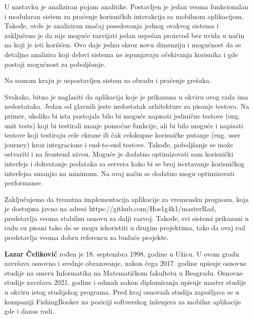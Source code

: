 \documentclass[12pt,oneside]{memoir}
\begin{document}
U nastavku je analiziran pojam analitike. Postavljen je jedan veoma funkcionalan i modularan sistem za praćenje korisničkih interakcija sa mobilnom aplikacijom. Takođe, ovde je analiziran značaj posedovanja jednog ovakvog sistema i zaključeno je da nije moguće razvijati jedan uspešan proizvod bez uvida u način na koji je isti korišćen. Ovo daje jednu skroz novu dimenziju i mogućnost da se detaljno analizira koji delovi sistema ne ispunjavaju očekivanja korisnika i gde postoji mogućnost za poboljšanje.

Na samom kraju je uspostavljen sistem za obradu i praćenje grešaka.

Svakako, bitno je naglasiti da aplikacija koje je prikazana u okviru ovog rada ima nedostataka. Jedan od glavnih jeste nedostatak arhitekture za pisanje testova. Na primer, ukoliko bi ista postojala bilo bi moguće napisati jedinične testove (eng. unit tests) koji bi testirali manje pomoćne funkcije, ali bi bilo moguće i napisati testove koji testiraju cele ekrane ili čak celokupne korisničke putanje (eng. user journey) kroz integracione i end-to-end testove. Takođe, poboljšanje se može ostvariti i na frontend nivou. Moguće je dodatno optimizovati sam korisnički interfejs i dohvatanje podataka sa servera kako bi se broj iscrtavanje korisničkog interfejsa smanjio na minimum. Na ovaj način se dodatno mogu optimizovati performanse.

Zaključujemo da trenutna implementacija aplikacije za vremensku prognozu, koja je dostupna javno na adresi https://github.com/Hos1g4k1/masterRad, predstavlja veoma stabilnu osnovu za dalji razvoj. Takođe, svi sistemi prikazani u radu su pisani tako da se mogu iskoristiti u drugim projektima, tako da ovaj rad predstavlja veoma dobru referencu za buduće projekte.


\literatura

\backmatter

\begin{biografija}
  \textbf{Lazar Čeliković} rođen je 18. septembra 1998. godine u Užicu. U ovom gradu završava osnovno i srednje obrazovanje, nakon čega 2017. godine upisuje osnovne studije na smeru Informatika na Matematičkom fakultetu u Beogradu. Osnovne studije završava 2021. godine i odmah nakon diplomiranja upisuje master studije u okviru istog studijskog programa. Pred kraj osnovnih studija zapošljava se u kompaniji FishingBooker na poziciji softverskog inženjera za mobilne aplikacije gde i danas radi.
\end{biografija}
\end{document}
